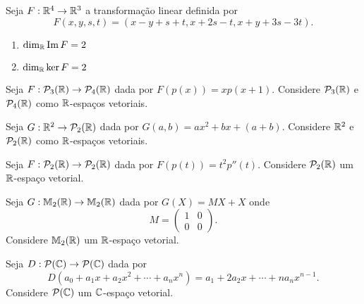 \documentclass[12pt]{exam}
\begin{document}
\begin{exercicio}\label{nucleo_imagem_inicio}
    Seja $F : \mathbb{R}^4 \to \mathbb{R}^3$ a transformação linear definida por
    \[
        F(x,y,s,t) = (x - y + s + t, x + 2s - t, x + y + 3s - 3t).
    \]
    \begin{solucao}
        \begin{enumerate}[label={\alph*})]
            \item $\dim_{\mathbb{R}}{\rm Im\,} F = 2$

            \item $\dim_{\mathbb{R}}\ker F = 2$
        \end{enumerate}
    \end{solucao}
\end{exercicio}

\begin{exercicio}
    Seja $F : \mathcal{P}_3(\mathbb{R}) \to \mathcal{P}_4(\mathbb{R})$ dada por $F(p(x)) = xp(x + 1)$. Considere $\mathcal{P}_3(\mathbb{R})$ e $\mathcal{P}_4(\mathbb{R})$ como $\mathbb{R}$-espaços vetoriais.
\end{exercicio}

\begin{exercicio}
    Seja $G : \mathbb{R}^2 \to \mathcal{P}_2(\mathbb{R})$ dada por $G(a,b) = ax^2 + bx + (a + b)$. Considere $\mathbb{R}^2$ e $\mathcal{P}_2(\mathbb{R})$ como $\mathbb{R}$-espaços vetoriais.
\end{exercicio}

\begin{exercicio}
    Seja $F : \mathcal{P}_2(\mathbb{R}) \to \mathcal{P}_2(\mathbb{R})$ dada por $F(p(t)) = t^2p''(t)$. Considere $\mathcal{P}_2(\mathbb{R})$ um $\mathbb{R}$-espaço vetorial.
\end{exercicio}

\begin{exercicio}
    Seja $G : \mathbb{M}_2(\mathbb{R}) \to \mathbb{M}_2(\mathbb{R})$ dada por $G(X) = MX + X$ onde
    \[
        M = \begin{pmatrix}
                1 & 0\\
                0 & 0
            \end{pmatrix}.
    \]
    Considere $\mathbb{M}_2(\mathbb{R})$ um $\mathbb{R}$-espaço vetorial.
\end{exercicio}

\begin{exercicio}
    Seja $D : \mathcal{P}(\mathbb{C}) \to \mathcal{P}(\mathbb{C})$ dada por
    \[
        D(a_0 + a_1x + a_2x^2 + \cdots + a_nx^n) = a_1 + 2a_2x + \cdots + na_nx^{n - 1}.
    \]
    Considere $\mathcal{P}(\mathbb{C})$ um $\mathbb{C}$-espaço vetorial.
\end{exercicio}
\end{document}

